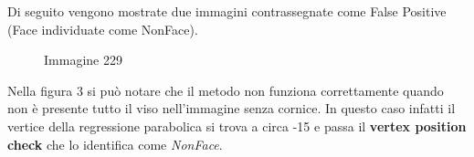 \documentclass[
  italian,
]{article}
\begin{document}
Di seguito vengono mostrate due immagini contrassegnate come False Positive (Face individuate come NonFace).

\begin{figure}
\centering
{}%
\qquad
{}%
\qquad
{}%
\caption{Immagine 229}
\end{figure}
Nella figura 3 si può notare che il metodo non funziona correttamente quando non è presente tutto il viso nell'immagine senza cornice.\newline
In questo caso infatti il vertice della regressione parabolica si trova a circa -15 e passa il \textbf{vertex position check}  che lo identifica come \emph{NonFace}.
\end{document}
